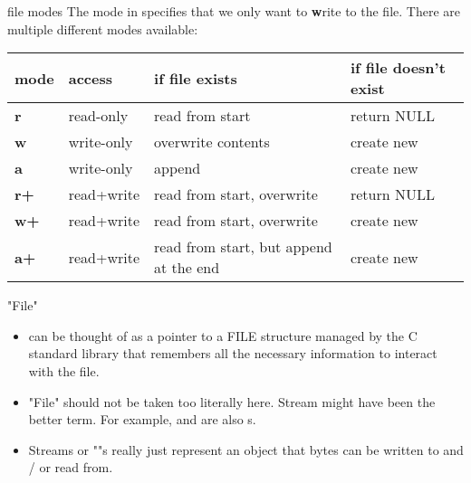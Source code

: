 \documentclass[10pt,graphics,aspectratio=169,table]{beamer}
\begin{document}
\begin{frame}{file modes}
    The  mode in  specifies that we
    only want to \textbf{w}rite to the file.
    There are multiple different modes available: 


    \begin{tabular}{|l|l|l|l|}
        \hline 
        \textbf{mode} & \textbf{access} & \textbf{if file exists} & \textbf{if file doesn't exist}\\ \hline 
        \textbf{r} & read-only & read from start & return NULL \\\hline
        \textbf{w} & write-only & overwrite contents & create new \\\hline
        \textbf{a} & write-only & append & create new \\\hline
        \textbf{r+} & read+write & read from start, overwrite & return NULL \\\hline
        \textbf{w+} & read+write & read from start, overwrite & create new \\\hline
        \textbf{a+} & read+write & read from start, but append at the end& create new \\\hline
    \end{tabular}
\end{frame}

\begin{frame}[fragile]{"File"}
    
    \begin{itemize}
        \item  {} can be thought of as a pointer to a FILE structure managed
        by the C standard library that remembers all the necessary information
        to interact with the file. 

        \item  "File" should not be taken too literally here.
        Stream might have been the better term.
        For example,  and  are also s.

        \item Streams or ""s really just represent an object that bytes 
            can be written to and / or read from.
    \end{itemize}
   
    
  

  

\end{frame}
\end{document}
